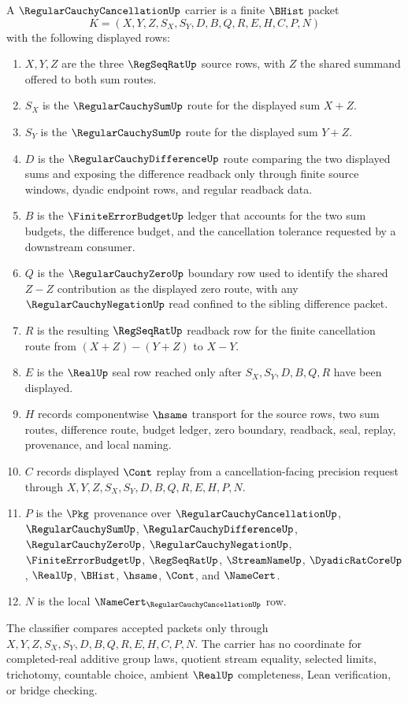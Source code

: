 \begin{definition}
\label{def:regular-cauchy-cancellation-carrier}
A $\RegularCauchyCancellationUp$ carrier is a finite $\BHist$ packet
$$
K=(X,Y,Z,S_X,S_Y,D,B,Q,R,E,H,C,P,N)
$$
with the following displayed rows:
\begin{enumerate}
\item $X,Y,Z$ are the three $\RegSeqRatUp$ source rows, with $Z$ the shared summand offered to both sum routes.
\item $S_X$ is the $\RegularCauchySumUp$ route for the displayed sum $X+Z$.
\item $S_Y$ is the $\RegularCauchySumUp$ route for the displayed sum $Y+Z$.
\item $D$ is the $\RegularCauchyDifferenceUp$ route comparing the two displayed sums and exposing the difference readback only through finite source windows, dyadic endpoint rows, and regular readback data.
\item $B$ is the $\FiniteErrorBudgetUp$ ledger that accounts for the two sum budgets, the difference budget, and the cancellation tolerance requested by a downstream consumer.
\item $Q$ is the $\RegularCauchyZeroUp$ boundary row used to identify the shared $Z-Z$ contribution as the displayed zero route, with any $\RegularCauchyNegationUp$ read confined to the sibling difference packet.
\item $R$ is the resulting $\RegSeqRatUp$ readback row for the finite cancellation route from $(X+Z)-(Y+Z)$ to $X-Y$.
\item $E$ is the $\RealUp$ seal row reached only after $S_X,S_Y,D,B,Q,R$ have been displayed.
\item $H$ records componentwise $\hsame$ transport for the source rows, two sum routes, difference route, budget ledger, zero boundary, readback, seal, replay, provenance, and local naming.
\item $C$ records displayed $\Cont$ replay from a cancellation-facing precision request through $X,Y,Z,S_X,S_Y,D,B,Q,R,E,H,P,N$.
\item $P$ is the $\Pkg$ provenance over $\RegularCauchyCancellationUp$, $\RegularCauchySumUp$, $\RegularCauchyDifferenceUp$, $\RegularCauchyZeroUp$, $\RegularCauchyNegationUp$, $\FiniteErrorBudgetUp$, $\RegSeqRatUp$, $\StreamNameUp$, $\DyadicRatCoreUp$, $\RealUp$, $\BHist$, $\hsame$, $\Cont$, and $\NameCert$.
\item $N$ is the local $\NameCert_{\RegularCauchyCancellationUp}$ row.
\end{enumerate}
The classifier compares accepted packets only through $X,Y,Z,S_X,S_Y,D,B,Q,R,E,H,C,P,N$. The carrier has no coordinate for completed-real additive group laws, quotient stream equality, selected limits, trichotomy, countable choice, ambient $\RealUp$ completeness, Lean verification, or bridge checking.
\end{definition}

